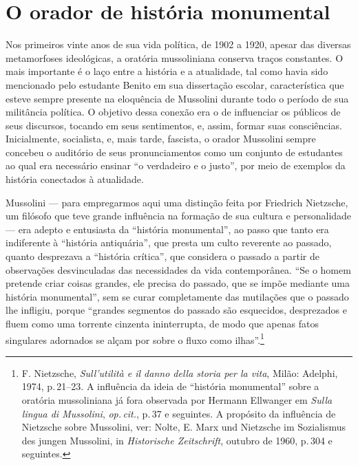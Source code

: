 \section{O orador de história monumental}

Nos primeiros vinte anos de sua vida política, de 1902 a 1920, apesar
das diversas metamorfoses ideológicas, a oratória mussoliniana conserva
traços constantes. O mais importante é o laço entre a história e a
atualidade, tal como havia sido mencionado pelo estudante Benito em sua
dissertação escolar, característica que esteve sempre presente na
eloquência de Mussolini durante todo o período de sua militância
política. O objetivo dessa conexão era o de influenciar os públicos de
seus discursos, tocando em seus sentimentos, e, assim, formar suas
consciências. Inicialmente, socialista, e, mais tarde, fascista, o
orador Mussolini sempre concebeu o auditório de seus pronunciamentos
como um conjunto de estudantes ao qual era necessário ensinar ``o
verdadeiro e o justo'', por meio de exemplos da história conectados à
atualidade.

Mussolini --- para empregarmos aqui uma distinção feita por Friedrich
Nietzsche, um filósofo que teve grande influência na formação de sua
cultura e personalidade --- era adepto e entusiasta da ``história
monumental'', ao passo que tanto era indiferente à ``história
antiquária'', que presta um culto reverente ao passado, quanto
desprezava a ``história crítica'', que considera o passado a partir de
observações desvinculadas das necessidades da vida contemporânea. ``Se o
homem pretende criar coisas grandes, ele precisa do passado, que se
impõe mediante uma história monumental'', sem se curar completamente das
mutilações que o passado lhe infligiu, porque ``grandes segmentos do
passado são esquecidos, desprezados e fluem como uma torrente cinzenta
ininterrupta, de modo que apenas fatos singulares adornados se alçam por
sobre o fluxo como ilhas''.\footnote{F. Nietzsche, \emph{Sull'utilità e
  il danno della storia per la vita}, Milão: Adelphi, 1974, p.\,21--23. A
  influência da ideia de ``história monumental'' sobre a oratória
  mussoliniana já fora observada por Hermann Ellwanger em \emph{Sulla
  lingua di Mussolini}, \emph{op.\,cit.}, p.\,37 e seguintes. A propósito
  da influência de Nietzsche sobre Mussolini, ver: Nolte, E. Marx und
  Nietzsche im Sozialismus des jungen Mussolini, in \emph{Historische
  Zeitschrift}, outubro de 1960, p.\,304 e seguintes.}

